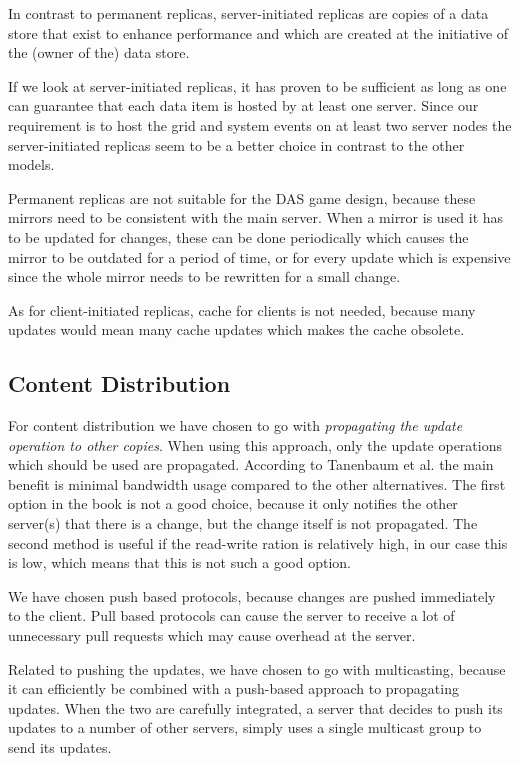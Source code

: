 \documentclass{article}
\begin{document}
In contrast to permanent replicas, server-initiated replicas are copies of a data store that exist to enhance performance and which are created at the initiative of the (owner of the) data store. %

If we look at server-initiated replicas, it has proven to be sufficient as long as one can guarantee that each data item is hosted by at least one server. Since our requirement is to host the grid and system events on at least two server nodes the server-initiated replicas seem to be a better choice in contrast to the other models. 

Permanent replicas are not suitable for the DAS game design, because these mirrors need to be consistent with the main server. When a mirror is used it has to be updated for changes, these can be done periodically which causes the mirror to be outdated for a period of time, or for every update which is expensive since the whole mirror needs to be rewritten for a small change.  

As for client-initiated replicas, cache for clients is not needed, because many updates would mean many cache updates which makes the cache obsolete. 

\subsection{Content Distribution}
For content distribution we have chosen to go with \emph{propagating the update operation to other copies}. When using this approach, only the update operations which should be used are propagated. According to Tanenbaum et al. %
the main benefit is minimal bandwidth usage compared to the other alternatives. The first option in the book is not a good choice, because it only notifies the other server(s) that there is a change, but the change itself is not propagated. The second method is useful if the read-write ration is relatively high, in our case this is low, which means that this is not such a good option.

We have chosen push based protocols, because changes are pushed immediately to the client. Pull based protocols can cause the server to receive a lot of unnecessary pull requests which may cause overhead at the server.

Related to pushing the updates, we have chosen to go with multicasting, because it can efficiently be combined with a push-based approach to propagating updates. When the two are carefully integrated, a server that decides to push its updates to a number of other servers, simply uses a single multicast group to send its updates. %
\end{document}
